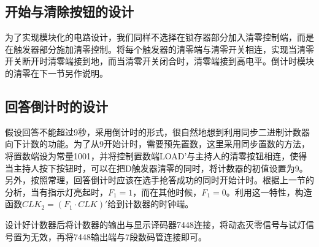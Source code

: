 \documentclass{ctexart}
\begin{document}
\subsection{开始与清除按钮的设计}
为了实现模块化的电路设计，我们同样不选择在锁存器部分加入清零控制端，而是在触发器部分施加清零控制。将每个触发器的清零端与清零开关相连，实现当清零开关断开时清零端接到地，而当清零开关闭合时，清零端接到高电平。倒计时模块的清零在下一节另作说明。
\subsection{回答倒计时的设计}
假设回答不能超过9秒，采用倒计时的形式，很自然地想到利用同步二进制计数器向下计数的功能。为了从9开始计时，需要预先置数，这里采用同步置数的方法，将置数端设为常量1001，并将控制置数端LOAD'与主持人的清零按钮相连，使得当主持人按下按钮时，可以在把D触发器清零的同时，将计数器的初值设置为9。另外，按照常理，回答倒计时应该在选手抢答成功的同时开始计时。根据上一节的分析，当有指示灯亮起时，$F_1=1$，而在其他时候，$F_1=0$。利用这一特性，构造函数$CLK_2=(F_1\cdot CLK)'$给到计数器的时钟端。

设计好计数器后将计数器的输出与显示译码器7448连接，将动态灭零信号与试灯信号置为无效，再将7448输出端与7段数码管连接即可。
\end{document}
